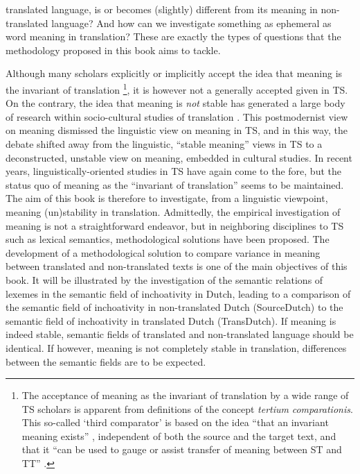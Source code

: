 translated language, is or becomes (slightly) different from its meaning in non-translated language? And how can we investigate something as ephemeral as word meaning in translation? These are exactly the types of questions that the methodology proposed in this book aims to tackle.

Although many scholars explicitly or implicitly accept the idea that meaning is the invariant of translation  \footnote{The acceptance of meaning as the invariant of translation by a wide range of TS scholars is apparent from definitions of the concept \textit{tertium} \textit{comparationis}. This so-called ‘third comparator’ is based on the idea “that an invariant meaning exists” \citep[31]{Hatim & Munday 2004}, independent of both the source and the target text, and that it “can be used to gauge or assist transfer of meaning between ST and TT” \citep[31]{Hatim & Munday 2004}.}, it is however not a generally accepted given in TS. On the contrary, the idea that meaning is \textit{not} stable has generated a large body of research within socio-cultural studies of translation  \citep{baumgarten_ideology_2012}. This postmodernist view on meaning dismissed the linguistic view on meaning in TS, and in this way, the debate shifted away from the linguistic, “stable meaning” views in TS to a deconstructed, unstable view on meaning, embedded in cultural studies. In recent years, linguistically-oriented studies in TS have again come to the fore, but the status quo of meaning as the “invariant of translation” seems to be maintained. The aim of this book is therefore to investigate, from a linguistic viewpoint, meaning (un)stability in translation. Admittedly, the empirical investigation of meaning is not a straightforward endeavor, but in neighboring disciplines to TS such as lexical semantics, methodological solutions have been proposed. The development of a methodological solution to compare variance in meaning between translated and non-translated texts is one of the main objectives of this book. It will be illustrated by the investigation of the semantic relations of lexemes in the semantic field of inchoativity in Dutch, leading to a comparison of the semantic field of inchoativity in non-translated Dutch (SourceDutch) to the semantic field of inchoativity in translated Dutch (TransDutch). If meaning is indeed stable, semantic fields of translated and non-translated language should be identical. If however, meaning is not completely stable in translation, differences between the semantic fields are to be expected. 

